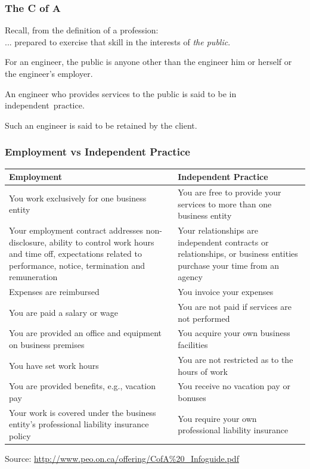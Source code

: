 \begin{frame}
\frametitle{The C of A}

Recall, from the definition of a profession:\\
\quad ... prepared to exercise that skill in the interests of \textit{the public}.

For an engineer, the public is anyone other than the engineer him or herself or the engineer's employer.

An engineer who provides services to the public is said to be in \alert{independent~practice}.

Such an engineer is said to be \alert{retained} by the client.

\end{frame}



\begin{frame}
\frametitle{Employment vs Independent Practice}

{\small
\begin{tabularx}{.95\textwidth}{X|X}
	\textbf{Employment} & \textbf{Independent Practice}\\ \hline
	You work exclusively for one business entity & You are free to provide your services to more than one business entity \\ \hline
	Your employment contract addresses non-disclosure, ability to control work hours and time off, expectations related to performance, notice, termination and remuneration & Your relationships are independent contracts or relationships, or business entities purchase your time from an agency \\ \hline
	Expenses are reimbursed & You invoice your expenses \\ \hline
	You are paid a salary or wage & You are not paid if services are not performed \\ \hline
	You are provided an office and equipment on business premises & You acquire your own business facilities \\ \hline
	You have set work hours & You are not restricted as to the hours of work \\ \hline
	You are provided benefits, e.g., vacation pay & You receive no vacation pay or bonuses \\ \hline
	Your work is covered under the business entity's professional liability insurance policy & You require your own professional liability insurance\\
\end{tabularx}
}

{\scriptsize Source: \url{http://www.peo.on.ca/offering/CofA\%20_Infoguide.pdf}}

\end{frame}



